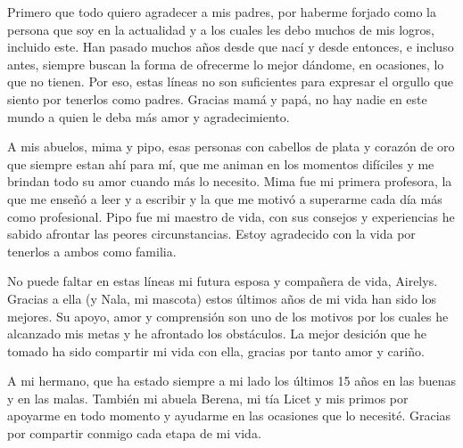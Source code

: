 

Primero que todo quiero agradecer a mis padres, por haberme forjado como la persona que soy en la actualidad y a los cuales les debo muchos de mis logros, incluido este. Han pasado muchos a\~nos desde que nac\'i y desde entonces, e incluso antes, siempre buscan la forma de ofrecerme lo mejor d\'andome, en ocasiones, lo que no tienen. Por eso, estas l\'ineas no son suficientes para expresar el orgullo que siento por tenerlos como padres. Gracias mam\'a y pap\'a, no hay nadie en este mundo a quien le deba m\'as amor y agradecimiento.

A mis abuelos, mima y pipo, esas personas con cabellos de plata y coraz\'on de oro que siempre estan ah\'i para m\'i, que me animan en los momentos dif\'iciles y me brindan todo su amor cuando m\'as lo necesito. Mima fue mi primera profesora, la que me ense\~n\'o a leer y a escribir y la que me motiv\'o a superarme cada d\'ia m\'as como profesional. Pipo fue mi maestro de vida, con sus consejos y experiencias he sabido afrontar las peores circunstancias. Estoy agradecido con la vida por tenerlos a ambos como familia.

No puede faltar en estas l\'ineas mi futura esposa y compa\~nera de vida, Airelys. Gracias a ella (y Nala, mi mascota) estos \'ultimos a\~nos de mi vida han sido los mejores. Su apoyo, amor y comprensi\'on son uno de los motivos por los cuales he alcanzado mis metas y he afrontado los obst\'aculos. La mejor desici\'on que he tomado ha sido compartir mi vida con ella, gracias por tanto amor y cari\~no.

A mi hermano, que ha estado siempre a mi lado los \'ultimos 15 a\~nos en las buenas y en las malas. Tambi\'en mi abuela Berena, mi t\'ia Licet y mis primos por apoyarme en todo momento y ayudarme en las ocasiones que lo necesit\'e. Gracias por compartir conmigo cada etapa de mi vida. 

